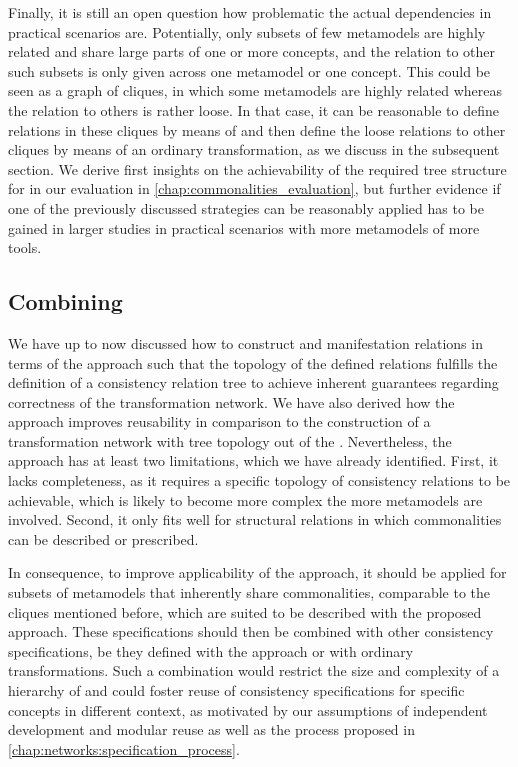 Finally, it is still an open question how problematic the actual dependencies in practical scenarios are.
Potentially, only subsets of few metamodels are highly related and share large parts of one or more concepts, and the relation to other such subsets is only given across one metamodel or one concept.
This could be seen as a graph of cliques, in which some metamodels are highly related whereas the relation to others is rather loose.
In that case, it can be reasonable to define relations in these cliques by means of \commonalities and then define the loose relations to other cliques by means of an ordinary transformation, as we discuss in the subsequent section.
We derive first insights on the achievability of the required tree structure for \commonalities in our evaluation in \autoref{chap:commonalities_evaluation}, but further evidence if one of the previously discussed strategies can be reasonably applied has to be gained in larger studies in practical scenarios with more metamodels of more tools.


\subsection{Combining \Commonalities}

We have up to now discussed how to construct \conceptmetamodels and manifestation relations in terms of the \commonalities approach such that the topology of the defined relations fulfills the definition of a consistency relation tree to achieve inherent guarantees regarding correctness of the transformation network.
We have also derived how the \commonalities approach improves reusability in comparison to the construction of a transformation network with tree topology out of the \concretemetamodels.
Nevertheless, the approach has at least two limitations, which we have already identified.
First, it lacks completeness, as it requires a specific topology of consistency relations to be achievable, which is likely to become more complex the more metamodels are involved.
Second, it only fits well for structural relations in which commonalities can be described or prescribed.

In consequence, to improve applicability of the approach, it should be applied for subsets of metamodels that inherently share commonalities, comparable to the cliques mentioned before, which are suited to be described with the proposed approach.
These specifications should then be combined with other consistency specifications, be they defined with the \commonalities approach or with ordinary transformations.
Such a combination would restrict the size and complexity of a hierarchy of \commonalities and could foster reuse of consistency specifications for specific concepts in different context, as motivated by our assumptions of independent development and modular reuse as well as the process proposed in \autoref{chap:networks:specification_process}.

